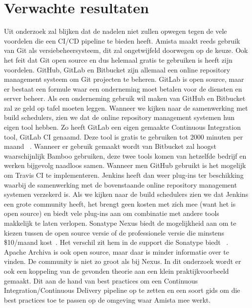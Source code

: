     \section{Verwachte resultaten}
    \label{sec:verwachte_resultaten}
    
    Uit onderzoek zal blijken dat de nadelen niet zullen opwegen tegen de vele voordelen die een CI/CD pipeline te bieden heeft.
    Amista maakt reeds gebruik van Git als versiebeheersysteem, dit zal ongetwijfeld doorwegen op de keuze. Ook het feit dat Git open source en dus helemaal gratis te gebruiken is heeft zijn voordelen.
    GitHub, GitLab en Bitbucket zijn allemaal een online repository management systeem om Git projecten te beheren.
    GitLab is open source, maar er bestaat een formule waar een onderneming moet betalen voor de diensten en server beheer.
    Als een onderneming gebruik wil maken van GitHub en Bitbucket zal ze geld op tafel moeten leggen. 
    Wanneer we kijken naar de samenwerking met build schedulers, zien we dat de online repository management systemen hun eigen tool hebben. 
    Zo heeft GitLab een eigen gemaakte Continuous Integration tool, GitLab CI genaamd. Deze tool is gratis te gebruiken tot 2000 minuten per maand ~\autocite{GitLabPricing2019}.
    Wanneer er gebruik gemaakt wordt van Bitbucket zal hoogst waarschijnlijk Bamboo gebruiken, deze twee tools komen van hetzelfde bedrijf en werken bijgevolg naadloos samen.
    Wanneer men GitHub gebruikt is het mogelijk om Travis CI te implementeren.
    Jenkins heeft dan weer plug-ins ter beschikking waarbij de samenwerking met de bovenstaande online repository management systemen verzekerd is.
    \newline
    Als we kijken naar de build schedulers zien we dat Jenkins een grote community heeft, het brengt geen kosten met zich mee (want het is open source) en biedt vele plug-ins aan om combinatie met andere tools makkelijk te laten verlopen.
    Sonatype Nexus biedt de mogelijkheid aan om te kiezen tussen de open source versie of de professionele versie die minstens \$10/maand kost~\autocite{SonatypeNexusPricing2019}. Het verschil zit hem in de support die Sonatype biedt ~\autocite{OBrien2010}.
    Apache Archiva is ook open source, maar daar is minder informatie over te vinden. De community is niet zo groot als bij Nexus.
    \newline
    In dit onderzoek wordt er ook een koppeling van de gevonden theorie aan een klein praktijkvoorbeeld gemaakt. Dit aan de hand van best practices om een Continuous Integration/Continuous Delivery pipeline op te zetten en een soort gids om die best practices toe te passen op de omgeving waar Amista mee werkt.
    
